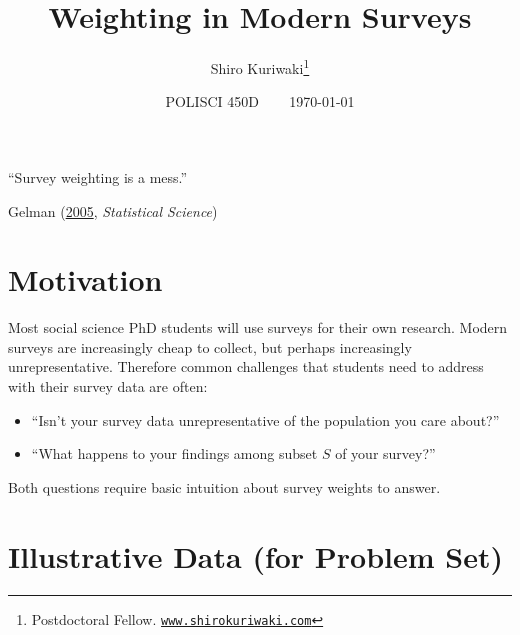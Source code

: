 \documentclass[10pt, letterpaper]{article}
\title{\textbf{Weighting in Modern Surveys}}
\author{\normalsize Shiro Kuriwaki\thanks{Postdoctoral Fellow. \href{https://www.shirokuriwaki.com}{\texttt{www.shirokuriwaki.com}}}}
\date{\normalsize POLISCI 450D ~~~ \today}
\theoremstyle{mytheoremstyle}
\begin{document}
\maketitle


\epigraph{``Survey weighting is a mess.''}{Gelman (\href{http://www.stat.columbia.edu/~gelman/research/published/STS226.pdf}{2005}, \emph{Statistical Science})}


\section*{Motivation}

Most social science PhD students will use surveys for their own research. Modern surveys are increasingly cheap to collect, but perhaps increasingly unrepresentative. Therefore common challenges that students need to address with their survey data are often:

\begin{itemize}
\item ``Isn't your survey data unrepresentative of the population you care about?''
\item ``What happens to your findings among subset $S$ of your survey?''
\end{itemize}

\noindent Both questions require basic intuition about survey weights to answer. 




\section*{Illustrative Data (for Problem Set)}
\end{document}
